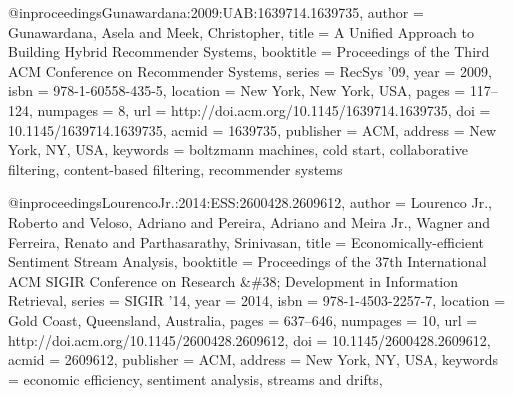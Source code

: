 @inproceedings{Gunawardana:2009:UAB:1639714.1639735,
	author = {Gunawardana, Asela and Meek, Christopher},
	title = {A Unified Approach to Building Hybrid Recommender Systems},
	booktitle = {Proceedings of the Third ACM Conference on Recommender Systems},
	series = {RecSys '09},
	year = {2009},
	isbn = {978-1-60558-435-5},
	location = {New York, New York, USA},
	pages = {117--124},
	numpages = {8},
	url = {http://doi.acm.org/10.1145/1639714.1639735},
	doi = {10.1145/1639714.1639735},
	acmid = {1639735},
	publisher = {ACM},
	address = {New York, NY, USA},
	keywords = {boltzmann machines, cold start, collaborative filtering, content-based filtering, recommender systems}
}

@inproceedings{LourencoJr.:2014:ESS:2600428.2609612,
    author = {Lourenco Jr., Roberto and Veloso, Adriano and Pereira, Adriano and Meira Jr., Wagner and Ferreira, Renato and Parthasarathy, Srinivasan},
    title = {Economically-efficient Sentiment Stream Analysis},
    booktitle = {Proceedings of the 37th International ACM SIGIR Conference on Research \&\#38; Development in Information Retrieval},
    series = {SIGIR '14},
    year = {2014},
    isbn = {978-1-4503-2257-7},
    location = {Gold Coast, Queensland, Australia},
    pages = {637--646},
    numpages = {10},
    url = {http://doi.acm.org/10.1145/2600428.2609612},
    doi = {10.1145/2600428.2609612},
    acmid = {2609612},
    publisher = {ACM},
    address = {New York, NY, USA},
    keywords = {economic efficiency, sentiment analysis, streams and drifts},
}